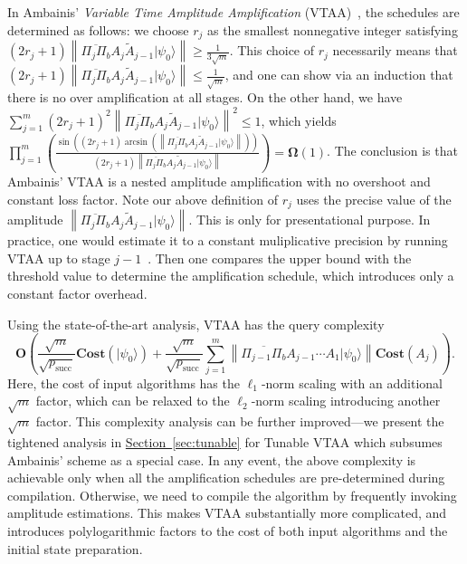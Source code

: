 \documentclass[letterpaper,onecolumn,11pt,accepted=2026-02-14]{quantumarticle}
\newcommand{\norm}[1]{\left\lVert#1\right\rVert}
\theoremstyle{remark}
\theoremstyle{plain}
\renewcommand{\sec}[1]{\hyperref[sec:#1]{Section~\ref*{sec:#1}}}
\newcommand{\ket}[1]{|#1\rangle}
\begin{document}
In Ambainis' \emph{Variable Time Amplitude Amplification} (VTAA)~\cite{Ambainis2012VTAA}, the schedules are determined as follows: we choose $r_j$ as the smallest nonnegative integer satisfying $(2r_j+1)\norm{\overline{\Pi_j\Pi_b}A_j\widetilde A_{j-1}\ket{\psi_0}}\geq\frac{1}{3\sqrt{m}}$. This choice of $r_j$ necessarily means that $(2r_j+1)\norm{\overline{\Pi_j\Pi_b}A_j\widetilde A_{j-1}\ket{\psi_0}}\leq\frac{1}{\sqrt{m}}$, and one can show via an induction that there is no over amplification at all stages. On the other hand, we have $\sum_{j=1}^m(2r_j+1)^2\norm{\overline{\Pi_j\Pi_b}A_j\widetilde A_{j-1}\ket{\psi_0}}^2\leq1$, which yields $\prod_{j=1}^m\left(\frac{\sin\left((2r_j+1)\arcsin\left(\norm{\overline{\Pi_j\Pi_b}A_j\widetilde A_{j-1}\ket{\psi_0}}\right)\right)}{(2r_j+1)\norm{\overline{\Pi_j\Pi_b}A_j\widetilde A_{j-1}\ket{\psi_0}}}\right)=\mathbf{\Omega}(1)$. The conclusion is that Ambainis' VTAA is a nested amplitude amplification with no overshoot and constant loss factor. Note our above definition of $r_j$ uses the precise value of the amplitude $\norm{\overline{\Pi_j\Pi_b}A_j\widetilde A_{j-1}\ket{\psi_0}}$. This is only for presentational purpose. In practice, one would estimate it to a constant muliplicative precision by running VTAA up to stage $j-1$~\cite[Theorem 23]{Chakraborty2018BlockEncoding}. Then one compares the upper bound with the threshold value to determine the amplification schedule, which introduces only a constant factor overhead.

Using the state-of-the-art analysis, VTAA has the query complexity
\begin{equation}
\label{eq:vtaa_cost2}
    \mathbf{O}\left(\frac{\sqrt{m}}{\sqrt{p_{\text{succ}}}}\mathbf{Cost}\left(\ket{\psi_0}\right)
    +\frac{\sqrt{m}}{\sqrt{p_{\text{succ}}}}\sum_{j=1}^m\norm{\overline{\Pi_{j-1}\Pi_b}A_{j-1}\cdots A_1\ket{\psi_0}}\mathbf{Cost}\left(A_j\right)\right).
\end{equation}
Here, the cost of input algorithms has the $\ell_1$-norm scaling with an additional $\sqrt{m}$ factor, which can be relaxed to the $\ell_2$-norm scaling introducing another $\sqrt{m}$ factor. This complexity analysis can be further improved---we present the tightened analysis in \sec{tunable} for Tunable VTAA which subsumes Ambainis' scheme as a special case. In any event, the above complexity is achievable only when all the amplification schedules are pre-determined during compilation. Otherwise, we need to compile the algorithm by frequently invoking amplitude estimations. This makes VTAA substantially more complicated, and introduces polylogarithmic factors to the cost of both input algorithms and the initial state preparation.
\end{document}
